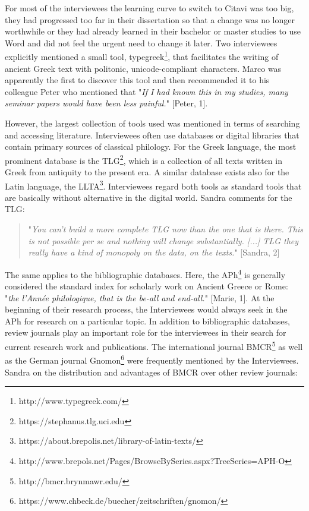 \documentclass[12pt, a4paper, titlepage, oneside, abstract=true, toc=listof, toc=bibliography, BCOR=1cm]{scrreprt}
\begin{document}
For most of the interviewees the learning curve to switch to Citavi was too big, they had progressed too far in their dissertation so that a change was no longer worthwhile or they had already learned in their bachelor or master studies to use Word and did not feel the urgent need to change it later. 
Two interviewees explicitly mentioned a small tool, typegreek\footnote{http://www.typegreek.com/}, that facilitates the writing of ancient Greek text with politonic, unicode-compliant characters. Marco was apparently the first to discover this tool and then recommended it to his colleague Peter who mentioned that "\textit{If I had known this in my studies, many seminar papers would have been less painful.}" [Peter, 1].

However, the largest collection of tools used was mentioned in terms of searching and accessing literature. Interviewees often use databases or digital libraries that contain primary sources of classical philology. 
For the Greek language, the most prominent database is the \gls{TLG}\footnote{https://stephanus.tlg.uci.edu}, which is a collection of all texts written in Greek from antiquity to the present era. A similar database exists also for the Latin language, the \gls{LLTA}\footnote{https://about.brepolis.net/library-of-latin-texts/}. Interviewees regard both tools as standard tools that are basically without alternative in the digital world. Sandra comments for the \gls{TLG}: 

\begin{quotation}
"\textit{You can't build a more complete TLG now than the one that is there. This is not possible per se and nothing will change substantially. [...] TLG they really have a kind of monopoly on the data, on the texts.}" [Sandra, 2]
\end{quotation}

The same applies to the bibliographic databases. Here, the \gls{APh}\footnote{http://www.brepols.net/Pages/BrowseBySeries.aspx?TreeSeries=APH-O} is generally considered the standard index for scholarly work on Ancient Greece or Rome: "\textit{the l'Année philologique, that is the be-all and end-all.}" [Marie, 1]. At the beginning of their research process, the Interviewees would always seek in the APh for research on a particular topic. 
In addition to bibliographic databases, review journals play an important role for the interviewees in their search for current research work and publications. The international journal \gls{BMCR}\footnote{http://bmcr.brynmawr.edu/} as well as the German journal \gls{Gnomon}\footnote{https://www.chbeck.de/buecher/zeitschriften/gnomon/} were frequently mentioned by the Interviewees. Sandra on the distribution and advantages of BMCR over other review journals: 
\end{document}

